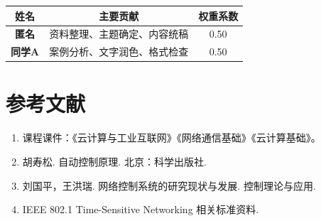 \documentclass[UTF8,a4paper,zihao=-4]{ctexart}
\begin{document}
\begin{table}[htbp]
  \centering
  \begin{tabular}{>{\bfseries}c c c}
    \toprule
    姓名 & 主要贡献 & 权重系数 \\
    \midrule
    匿名 & 资料整理、主题确定、内容统稿 & 0.50 \\
    同学A & 案例分析、文字润色、格式检查 & 0.50 \\
    \bottomrule
  \end{tabular}
\end{table}

\section*{参考文献}
\begin{enumerate}
  \item 课程课件：《云计算与工业互联网》《网络通信基础》《云计算基础》。
  \item 胡寿松. 自动控制原理. 北京：科学出版社.
  \item 刘国平，王洪瑞. 网络控制系统的研究现状与发展. 控制理论与应用.
  \item IEEE 802.1 Time-Sensitive Networking 相关标准资料.
\end{enumerate}
\end{document}
